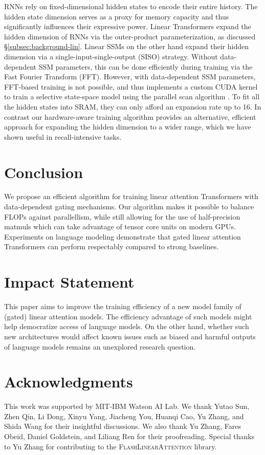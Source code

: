 RNNs rely on fixed-dimensional hidden states to encode their entire history. The hidden state dimension  serves as a proxy for memory capacity and thus significantly influences their expressive power. 
Linear Transformers expand the hidden dimension of RNNs via the outer-product parameterization, as discussed \S\ref{subsec:background-lin}. Linear SSMs on the other hand expand their hidden dimension via a single-input-single-output (SISO) strategy. 
Without data-dependent SSM parameters, this can be done efficiently during training via the Fast Fourier Transform (FFT). However, with data-dependent SSM parameters, FFT-based training is not possible, and thus \citet{Gu2023MambaLS} implements a custom CUDA kernel to train a selective state-space model using the parallel scan algorithm \citep{s5}. To fit all the hidden states into SRAM, they can only afford an expansion rate up to 16. In contrast our hardware-aware training algorithm provides an alternative, efficient approach for expanding the hidden dimension to a wider range, which we have shown useful in recall-intensive tasks.

\vspace{-2mm}

\vspace{-2mm}
\section{Conclusion}
\vspace{-2mm}
We propose an efficient algorithm for training linear attention Transformers with data-dependent gating mechanisms. Our algorithm makes it possible to balance FLOPs against parallellism, while still allowing for the use of half-precision matmuls which can take advantage of tensor core units on modern GPUs. Experiments on language modeling demonstrate that gated linear attention Transformers can perform respectably compared to strong baselines.
\label{sec:conc}

\section*{Impact Statement}

This paper aims to improve the training efficiency of a new model family of (gated) linear attention models. The efficiency advantage of such models might help democratize access of language models. On the other hand, whether such new architectures would affect known issues such as biased and harmful outputs of language models remains an unexplored research question.

\section*{Acknowledgments}

This work was supported by MIT-IBM Watson AI Lab. We thank Yutao Sun, Zhen Qin, Li Dong, Xinyu Yang, Jiacheng You, Huanqi Cao, Yu Zhang, and Shida Wang for their insightful discussions. We also thank Yu Zhang, Fares Obeid, Daniel Goldstein, and Liliang Ren for their proofreading. Special thanks to Yu Zhang for contributing to the \textsc{FlashLinearAttention} library.

\newpage

